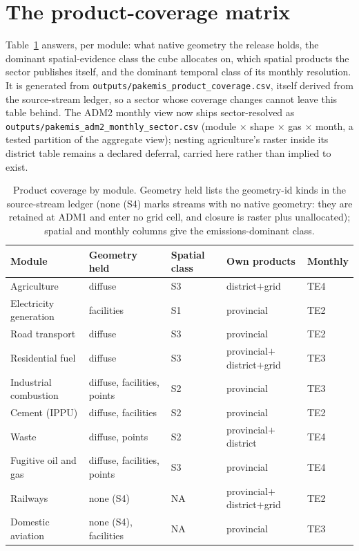 \section{The product-coverage matrix}
\label{sup:coverage}

Table~\ref{tab:coverage} answers, per module: what native geometry the
release holds, the dominant spatial-evidence class the cube allocates on,
which spatial products the sector publishes itself, and the dominant
temporal class of its monthly resolution. It is generated from
\texttt{outputs/pakemis\_product\_coverage.csv}, itself derived from the
source-stream ledger, so a sector whose coverage changes cannot leave this
table behind. The ADM2 monthly view now ships sector-resolved as
\texttt{outputs/pakemis\_adm2\_monthly\_sector.csv} (module $\times$
shape $\times$ gas $\times$ month, a tested partition of the aggregate
view); nesting agriculture's raster inside its district table remains a
declared deferral, carried here rather than implied to exist.

\begin{table}[htbp]
\centering
\scriptsize
\begin{tabular}{@{}lllll@{}}
\toprule
\textbf{Module} & \textbf{Geometry held} & \textbf{Spatial class} & \textbf{Own products} & \textbf{Monthly} \\
\midrule
Agriculture & diffuse & S3 & district$+$grid & TE4 \\
Electricity generation & facilities & S1 & provincial & TE2 \\
Road transport & diffuse & S3 & provincial & TE2 \\
Residential fuel & diffuse & S3 & provincial$+$district$+$grid & TE3 \\
Industrial combustion & diffuse, facilities, points & S2 & provincial & TE3 \\
Cement (IPPU) & diffuse, facilities & S2 & provincial & TE2 \\
Waste & diffuse, points & S2 & provincial$+$district & TE4 \\
Fugitive oil and gas & diffuse, facilities, points & S3 & provincial & TE4 \\
Railways & none (S4) & NA & provincial$+$district$+$grid & TE2 \\
Domestic aviation & none (S4), facilities & NA & provincial & TE3 \\
\bottomrule
\end{tabular}
\caption{Product coverage by module. Geometry held lists the geometry-id
kinds in the source-stream ledger (none (S4) marks streams with no native
geometry: they are retained at ADM1 and enter no grid cell, and closure is
raster plus unallocated); spatial and
monthly columns give the emissions-dominant class.}
\label{tab:coverage}
\end{table}
